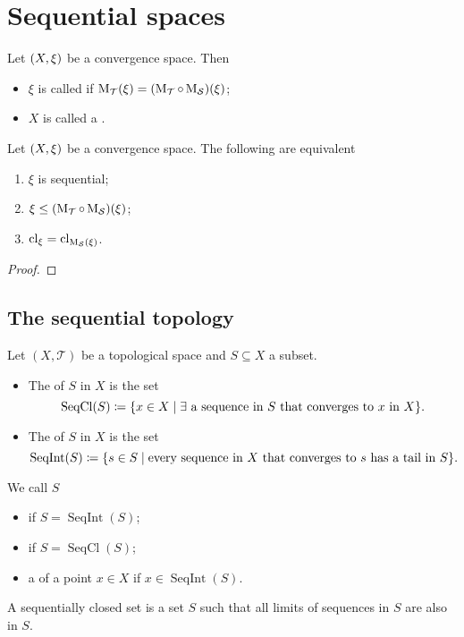 \section{Sequential spaces}
\begin{definition}
Let $\left( X,\xi \right)$ be a convergence space. Then
\begin{itemize}
\item $\xi$ is called  if $\operatorname{M_\mathcal{T}}(\xi) = (\operatorname{M_\mathcal{T}}\circ \operatorname{M_\mathcal{S}})(\xi)$;
\item $X$ is called a .
\end{itemize} 
\end{definition}

\begin{lemma}
Let $\left( X,\xi \right)$ be a convergence space. The following are equivalent
\begin{enumerate}
\item $\xi$ is sequential;
\item $\xi \leq (\operatorname{M_\mathcal{T}}\circ \operatorname{M_\mathcal{S}})(\xi)$;
\item $\operatorname{cl}_\xi = \operatorname{cl}_{\operatorname{M_\mathcal{S}}(\xi)}$.
\end{enumerate}
\end{lemma}
\begin{proof}

\end{proof}

\subsection{The sequential topology}
\begin{definition}
Let $(X,\mathcal{T})$ be a topological space and $S\subseteq X$ a subset.
\begin{itemize}
\item The  of $S$ in $X$ is the set
\[ \operatorname{SeqCl}(S) \defeq \setbuilder{x\in X}{\text{$\exists$ a sequence in $S$ that converges to $x$ in $X$}}. \]
\item The  of $S$ in $X$ is the set
\[ \operatorname{SeqInt}(S) \defeq \setbuilder{s\in S}{\text{every sequence in $X$ that converges to $s$ has a tail in $S$}}. \]
\end{itemize}
We call $S$
\begin{itemize}
\item {} if $S = \operatorname{SeqInt}(S)$;
\item {} if $S = \operatorname{SeqCl}(S)$;
\item a  of a point $x\in X$ if $x\in \operatorname{SeqInt}(S)$.
\end{itemize}
\end{definition}
A sequentially closed set is a set $S$ such that all limits of sequences in $S$ are also in $S$.

